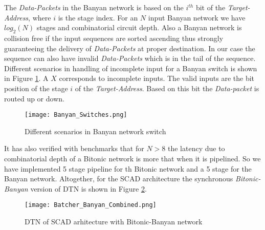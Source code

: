 					      The \textit{Data-Packets} in the Banyan network is based on the $i^{th}$ bit of the \textit{Target-Address}, where $i$ is the stage index. For an $N$ input Banyan network we have $log_{2}(N)$ 
					      stages and combinatorial circuit depth. Also a Banyan network is collision free if the input sequences are sorted ascending
					      thus strongly guaranteeing the delivery of \textit{Data-Packets} at proper destination. In our case 
					      the sequence can also have invalid \textit{Data-Packets} which is in the tail of the sequence. Different scenarios in handling of incomplete input for a Banyan switch is shown in Figure \ref{fig:Banyan_Switches}.
					      A $X$ corresponds to incomplete inputs. The valid inputs are the bit position of the stage $i$ of the \textit{Target-Address}. Based on this bit the \textit{Data-packet} is routed up or down.
					      \begin{figure}[!ht]
						      \texttt{[image: Banyan\_Switches.png]}
						      \caption{Different scenarios in Banyan network switch }
					      \label{fig:Banyan_Switches}
					      \end{figure}
					      It has also verified with benchmarks \cite{sorting_network_on_fpgas} that for $N > 8$ the latency due to combinatorial depth of a Bitonic network is more that when it is pipelined. So we have implemented 5 stage pipeline 
					      for th Bitonic network and a 5 stage for the Banyan network. Altogether, for the SCAD architecture the synchronous \textit{Bitonic-Banyan} version of DTN is shown in Figure \ref{fig:Batcher_Banyan_Combined}.
					      \begin{figure}[!ht]
						      \texttt{[image: Batcher\_Banyan\_Combined.png]}
						      \caption{DTN of SCAD arhitecture with Bitonic-Banyan network}
					      \label{fig:Batcher_Banyan_Combined}
					      \end{figure}
